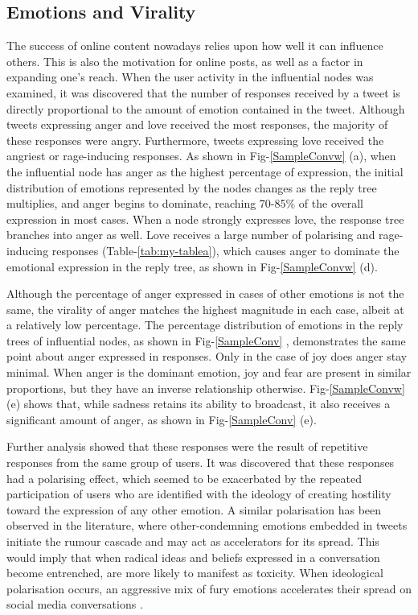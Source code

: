 \documentclass[acmtog]{acmart}
\begin{document}
\subsection{Emotions and Virality}
The success of online content nowadays relies upon how well it can influence others. This is also the motivation for online posts, as well as a factor in expanding one's reach. When the user activity in the influential nodes was examined, it was discovered that the number of responses received by a tweet is directly proportional to the amount of emotion contained in the tweet. Although tweets expressing anger and love received the most responses, the majority of these responses were angry. Furthermore, tweets expressing love received the angriest or rage-inducing responses. As shown in Fig-\ref{SampleConvw} (a), when the influential node has anger as the highest percentage of expression, the initial distribution of emotions represented by the nodes changes as the reply tree multiplies, and anger begins to dominate, reaching 70-85\% of the overall expression in most cases. When a node strongly expresses love, the response tree branches into anger as well. Love receives a large number of polarising and rage-inducing responses (Table-\ref{tab:my-tablea}), which causes anger to dominate the emotional expression in the reply tree, as shown in Fig-\ref{SampleConvw}  (d).

Although the percentage of anger expressed in cases of other emotions is not the same, the virality of anger matches the highest magnitude in each case, albeit at a relatively low percentage. The percentage distribution of emotions in the reply trees of influential nodes, as shown in Fig-\ref{SampleConv} , demonstrates the same point about anger expressed in responses. Only in the case of joy does anger stay minimal. When anger is the dominant emotion, joy and fear are present in similar proportions, but they have an inverse relationship otherwise. Fig-\ref{SampleConvw}  (e) shows that, while sadness retains its ability to broadcast, it also receives a significant amount of anger, as shown in Fig-\ref{SampleConv}  (e).

Further analysis showed that these responses were the result of repetitive responses from the same group of users. It was discovered that these responses had a polarising effect, which seemed to be exacerbated by the repeated participation of users who are identified with the ideology of creating hostility toward the expression of any other emotion. A similar polarisation has been observed in the literature, where other-condemning emotions embedded in tweets initiate the rumour cascade and may act as accelerators for its spread. This would imply that when radical ideas and beliefs expressed in a conversation become entrenched, are more likely to manifest as toxicity. When ideological polarisation occurs, an aggressive mix of fury emotions accelerates their spread on social media conversations \cite{solovev2022moral}.  
\end{document}
